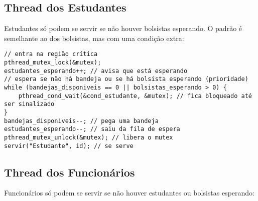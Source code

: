 \documentclass[10pt,a4paper]{article}
\begin{document}
\subsection{Thread dos Estudantes}

Estudantes só podem se servir se não houver bolsistas esperando. O padrão é semelhante ao dos bolsistas, mas com uma condição extra:

\begin{verbatim}
// entra na região crítica
pthread_mutex_lock(&mutex);
estudantes_esperando++; // avisa que está esperando
// espera se não há bandeja ou se há bolsista esperando (prioridade)
while (bandejas_disponiveis == 0 || bolsistas_esperando > 0) {
    pthread_cond_wait(&cond_estudante, &mutex); // fica bloqueado até ser sinalizado
}
bandejas_disponiveis--; // pega uma bandeja
estudantes_esperando--; // saiu da fila de espera
pthread_mutex_unlock(&mutex); // libera o mutex
servir("Estudante", id); // se serve
\end{verbatim}

\subsection{Thread dos Funcionários}

Funcionários só podem se servir se não houver estudantes ou bolsistas esperando:
\end{document}
